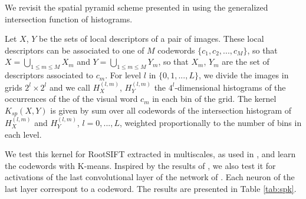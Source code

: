 We revisit the spatial pyramid scheme presented in \cite{spk} using the generalized intersection function of histograms.

Let $X$, $Y$ be the sets of local descriptors of a pair of images.
These local descriptors can be associated to one of $M$ codewords $\{c_1,c_2,...,c_M\}$, so that $X=\bigcup_{1\leq m \leq M}X_m$ and $Y=\bigcup_{1\leq m \leq M}Y_m$, so that $X_m$, $Y_m$ are the set of descriptors associated to $c_m$.
For level $l$ in $\{0,1,..., L\}$, we divide the images in grids $2^l\times 2^l$ and we call $H^{(l,m)}_X$, $H^{(l,m)}_Y$ the $4^l$-dimensional histograms of the occurrences of the of the visual word $c_m$ in each bin of the grid.
The kernel $K_{sp}(X,Y)$ is given by sum over all codewords of the intersection histogram of $H^{(l,m)}_X$ and $H^{(l,m)}_Y$, $l=0,...,L$,  weighted proportionally to the number of bins in each level.

We test this kernel for RootSIFT extracted in multiscales, as used in \cite{spk}, and learn the codewords with K-means. Inspired by the results of \cite{SPPCNN}, we also test it for activations of the last convolutional layer of the network of \cite{SimonZisser15}. Each neuron of the last layer correspont to a codeword. The results are presented in Table \ref{tab:spk}.




